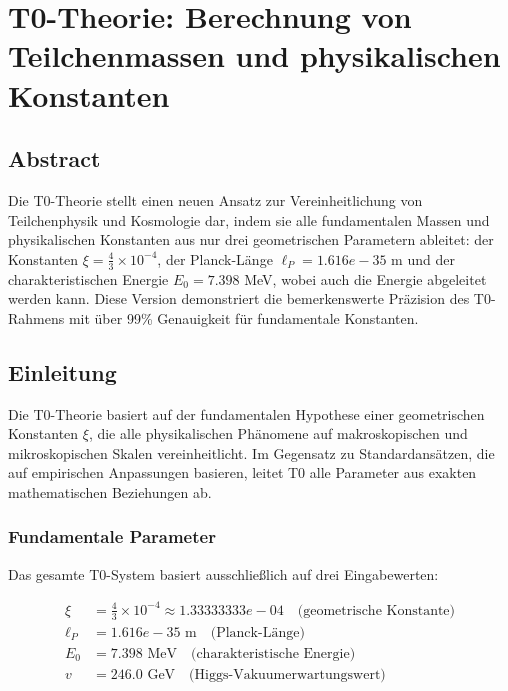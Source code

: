 \chapter{\textbf{T0-Theorie: Berechnung von Teilchenmassen und physikalischen Konstanten}}


	
	
\section*{Abstract}
		Die T0-Theorie stellt einen neuen Ansatz zur Vereinheitlichung von Teilchenphysik und Kosmologie dar, indem sie alle fundamentalen Massen und physikalischen Konstanten aus nur drei geometrischen Parametern ableitet: der Konstanten $\xi = \frac{4}{3} \times 10^{-4}$, der Planck-Länge $\ell_P = 1.616e-35$ m und der charakteristischen Energie $E_0 = 7.398$ MeV, wobei auch die Energie abgeleitet werden kann. Diese Version demonstriert die bemerkenswerte Präzision des T0-Rahmens mit über 99\% Genauigkeit für fundamentale Konstanten.

	
	
	\section{Einleitung}
	
	Die T0-Theorie basiert auf der fundamentalen Hypothese einer geometrischen Konstanten $\xi$, die alle physikalischen Phänomene auf makroskopischen und mikroskopischen Skalen vereinheitlicht. Im Gegensatz zu Standardansätzen, die auf empirischen Anpassungen basieren, leitet T0 alle Parameter aus exakten mathematischen Beziehungen ab.
	
	\subsection{Fundamentale Parameter}
	
	Das gesamte T0-System basiert ausschließlich auf drei Eingabewerten:
	
	\begin{align}
		\xi &= \frac{4}{3} \times 10^{-4} \approx 1.33333333e-04 \quad \text{(geometrische Konstante)} \\
		\ell_P &= 1.616e-35 \text{ m} \quad \text{(Planck-Länge)} \\
		E_0 &= 7.398 \text{ MeV} \quad \text{(charakteristische Energie)} \\
		v &= 246.0 \text{ GeV} \quad \text{(Higgs-Vakuumerwartungswert)}
	\end{align}
	
